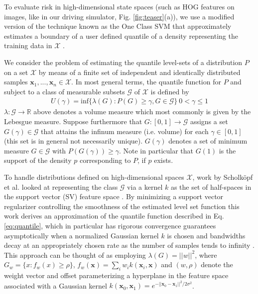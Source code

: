 \documentclass[10pt, conference]{ieeeconf}      %
\newcommand{\bx}{\mathbf{x}}
\newcommand{\fpnote}[1]{\ifthenelse{\boolean{include-notes}}%
 {\textcolor{blue}{\textbf{FP: #1}}}{}}
\begin{document}
To evaluate risk in high-dimensional state spaces (such as HOG features on images, like in our driving simulator, Fig. \ref{fig:teaser}(a)), we use
a modified version of the technique known as the One Class SVM that  approximately estimates a boundary of a user defined quantile of
a density representing the training data in $\mathcal{X}$ \cite{scholkopf2001estimating}.


We consider the problem of estimating the quantile level-sets of a distribution $P$ on a set $\mathcal{X}$ by means of a finite set of
independent and identically distributed samples $\mathbf{x}_1,...,\mathbf{x}_n\in \mathcal{X}$.
In most general terms, the quantile function for $P$ and subject to a class of measurable subsets $\mathcal{G}$ of $\mathcal{X}$ is
defined by
\begin{align}\label{eq:quantile}
U(\gamma) = \mbox{inf} \lbrace \lambda(G):P(G) \geq \gamma, G \in \mathcal{G} \rbrace \: 0<\gamma \leq 1
\end{align} 
$\lambda:\mathcal{G}\to \mathbb{R}$ above denotes a volume measure which most commonly is given by the Lebesgue measure.
Suppose furthermore that $G:[0,1]\to \mathcal{G}$ assigns a set $G(\gamma) \in \mathcal{G}$ that attains the infinum
measure (i.e. volume) for each $\gamma\in [0,1]$ (this set is in general not necessarily unique). 
$G(\gamma)$ denotes a set of minimum measure $G \in \mathcal{G}$ with $P(G(\gamma))\ge \gamma$. Note in particular that $G(1)$ is the support of the density $p$ corresponding to $P$, if $p$ exists. 

To handle distributions defined on high-dimensional spaces $\mathcal{X}$, work by Scholk{\"o}pf et al. looked at representing the class $\mathcal{G}$ via a kernel $k$ as the set of half-spaces in the support vector (SV) feature space \cite{scholkopf2001estimating}. 
By minimizing a support vector regularizer controlling the smoothness of the estimated level set function this work
derives an approximation of the quantile function described in Eq. \ref{eq:quantile}, which in particular has rigorous
convergence guarantees asymptotically when a normalized Gaussian kernel $k$ is chosen and bandwidths decay at an
appropriately chosen rate as the number of samples tends to infinity \cite{vert2006consistency}.
This approach can be thought of as employing $\lambda(G) = ||w||^2$, where $G_w = \lbrace x: f_w(x) \geq \rho \rbrace$,
$f_w(\mathbf{x}) = \sum_i w_i k(\mathbf{x}_i, \mathbf{x})$
and $(w,\rho)$ denote the weight vector and offset parameterizing a hyperplane in the feature space associated with a
Gaussian kernel $k(\bx_0,\bx_1) = e^{-||\bx_0 - \bx_1||^2/2\sigma^2}$.
\end{document}
